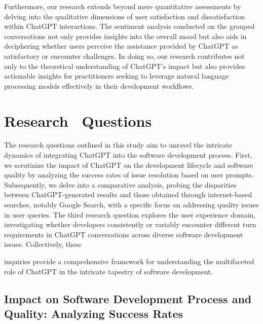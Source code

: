 \documentclass[journal]{IEEEtran}
\begin{document}
Furthermore, our research extends beyond mere quantitative assessments by delving into the qualitative dimensions of user satisfaction and dissatisfaction within ChatGPT interactions. The sentiment analysis conducted on the grouped conversations not only provides insights into the overall mood but also aids in deciphering whether users perceive the assistance provided by ChatGPT as satisfactory or encounter challenges. In doing so, our research contributes not only to the theoretical understanding of ChatGPT's impact but also provides actionable insights for practitioners seeking to leverage natural language processing models effectively in their development workflows.


\section{Research \ Questions}
The research questions outlined in this study aim to unravel the intricate dynamics of integrating ChatGPT into the software development process. First, we scrutinize the impact of ChatGPT on the development lifecycle and software quality by analyzing the success rates of issue resolution based on user prompts. Subsequently, we delve into a comparative analysis, probing the disparities between ChatGPT-generated results and those obtained through internet-based searches, notably Google Search, with a specific focus on addressing quality issues in user queries. The third research question explores the user experience domain, investigating whether developers consistently or variably encounter different turn requirements in ChatGPT conversations across diverse software development issues. Collectively, these
 
inquiries provide a comprehensive framework for understanding the multifaceted role of ChatGPT in the intricate tapestry of software development.

\subsection{Impact on Software Development Process and Quality: Analyzing Success Rates} 
\end{document}
